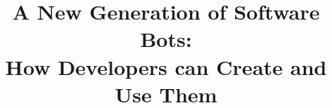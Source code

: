\documentclass{sig-alternate}
\begin{document}
%

\title{A New Generation of Software Bots:  \\
How Developers can Create and Use Them}

%
%
%
%
%
\end{document}
